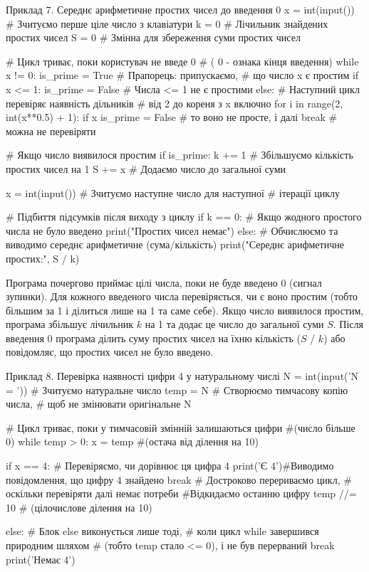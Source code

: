 \begin{py}{Приклад 7. Середнє арифметичне простих чисел до введення 0}
x = int(input())  # Зчитуємо перше ціле число з клавіатури
k = 0             # Лічильник знайдених простих чисел
S = 0             # Змінна для збереження суми простих чисел

# Цикл триває, поки користувач не введе 0
# ( 0 - ознака кінця введення)
while x != 0:
    is_prime = True  # Прапорець: припускаємо,
                     #  що число x є простим
    if x <= 1:
        is_prime = False  # Числа <= 1 не є простими
    else:
        # Наступний цикл перевіряє наявність дільників 
        # від 2 до кореня з x включно
        for i in range(2, int(x**0.5) + 1):
            if x %
                is_prime = False  # то воно не просте, і далі
                break             # можна не перевіряти

    # Якщо число виявилося простим
    if is_prime:
        k += 1  # Збільшуємо кількість простих чисел на 1
        S += x  # Додаємо число до загальної суми

    x = int(input())  # Зчитуємо наступне число для наступної 
                      # ітерації циклу

# Підбиття підсумків після виходу з циклу
if k == 0: # Якщо жодного простого числа не було введено
    print("Простих чисел немає") 
else:
    # Обчислюємо та виводимо середнє арифметичне (сума/кількість)
    print("Середнє арифметичне простих:", S / k)
\end{py}
Програма почергово приймає цілі числа, поки не буде введено 0 (сигнал зупинки). Для кожного введеного числа перевіряється, чи є воно простим (тобто більшим за 1 і ділиться лише на 1 та саме себе).  Якщо число виявилося простим, програма збільшує лічильник $k$ на 1 та додає це число до загальної суми $S$. Після введення 0 програма ділить суму простих чисел на їхню кількість ($S$ / $k$) або повідомляє, що простих чисел не було введено. 
\begin{py}{Приклад 8. Перевірка наявності цифри 4 у натуральному числі}
N = int(input('N = '))  # Зчитуємо натуральне число
temp = N                # Створюємо тимчасову копію числа,
# щоб не змінювати оригінальне N

# Цикл триває, поки у тимчасовій змінній залишаються цифри 
#(число більше 0)
while temp > 0:
    x = temp %
                    #(остача від ділення на 10)

    if x == 4:      # Перевіряємо, чи дорівнює ця цифра 4
        print('Є 4')#Виводимо повідомлення, що цифру 4 знайдено
        break   # Достроково перериваємо цикл, 
                # оскільки перевіряти далі немає потреби
    #Відкидаємо останню цифру 
    temp //= 10  # (цілочислове ділення на 10)

else: # Блок else виконується лише тоді,
   # коли цикл while завершився природним шляхом
   # (тобто temp стало <= 0), і не був перерваний break
   print('Немає 4')
\end{py}
